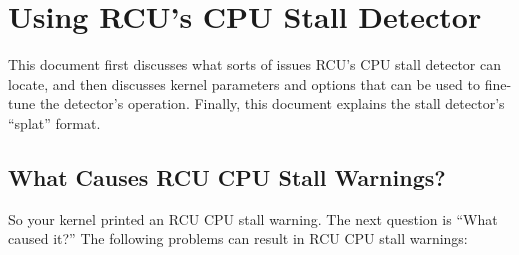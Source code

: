 
\section{Using RCU's CPU Stall Detector}
\label{sec:rcu:Using RCU's CPU Stall Detector}

This document first discusses what sorts of issues RCU's CPU stall
detector can locate, and then discusses kernel parameters and 
options that can be used to fine-tune the detector's operation.
Finally,
this document explains the stall detector's ``splat'' format.


\subsection{What Causes RCU CPU Stall Warnings?}

So your kernel printed an RCU CPU stall warning.
The next question is
``What caused it?''
The following problems can result in RCU CPU stall
warnings:

